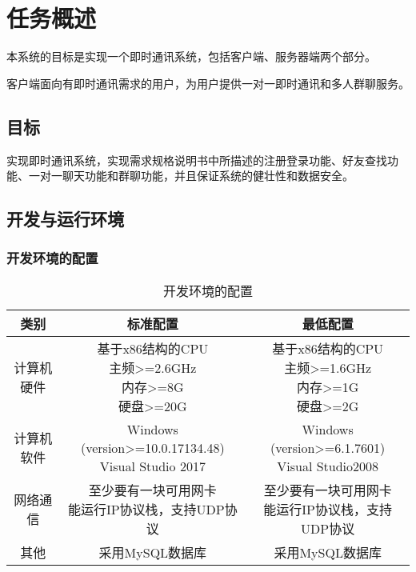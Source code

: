 \chapter{任务概述}
本系统的目标是实现一个即时通讯系统，包括客户端、服务器端两个部分。

客户端面向有即时通讯需求的用户，为用户提供一对一即时通讯和多人群聊服务。

\section{目标}
实现即时通讯系统，实现需求规格说明书中所描述的注册登录功能、好友查找功能、一对一聊天功能和群聊功能，并且保证系统的健壮性和数据安全。

\section{开发与运行环境}

\subsection{开发环境的配置}
\begin{table}[htbp]
\centering
\caption{开发环境的配置} \label{tab:development-environment}
\begin{tabular}{|c|c|c|}
    \hline
    类别 & 标准配置 & 最低配置 \\
    \hline
    计算机硬件 & \tabincell{c}{基于x86结构的CPU\\ 主频>=2.6GHz\\ 内存>=8G\\ 硬盘>=20G} & \tabincell{c}{基于x86结构的CPU\\ 主频>=1.6GHz\\ 内存>=1G\\ 硬盘>=2G} \\
    \hline
    计算机软件 & \tabincell{c}{Windows (version>=10.0.17134.48)\\ Visual Studio 2017} & \tabincell{c}{Windows (version>=6.1.7601)\\ Visual Studio2008} \\
    \hline
    网络通信 & \tabincell{c}{至少要有一块可用网卡\\ 能运行IP协议栈，支持UDP协议} & \tabincell{c}{至少要有一块可用网卡\\ 能运行IP协议栈，支持UDP协议} \\
    \hline
    其他 & 采用MySQL数据库 & 采用MySQL数据库 \\
    \hline
\end{tabular}
\end{table}

